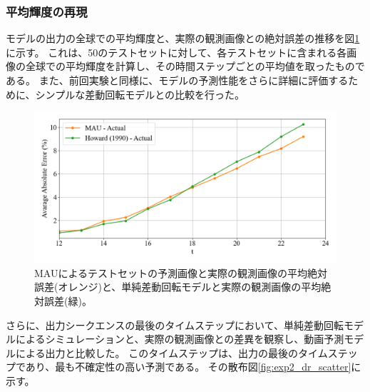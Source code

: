       \subsubsection{平均輝度の再現}
        モデルの出力の全球での平均輝度と、実際の観測画像との絶対誤差の推移を図\ref{fig:exp2_error}に示す。
        これは、50のテストセットに対して、各テストセットに含まれる各画像の全球での平均輝度を計算し、その時間ステップごとの平均値を取ったものである。
        また、前回実験と同様に、モデルの予測性能をさらに詳細に評価するために、シンプルな差動回転モデルとの比較を行った。
        \begin{figure}[htbp]
          \centering
          \includegraphics[width=\textwidth]{figures/exp2/error_dr.png}
          \caption{MAUによるテストセットの予測画像と実際の観測画像の平均絶対誤差(オレンジ)と、単純差動回転モデルと実際の観測画像の平均絶対誤差(緑)。}
          \label{fig:exp2_error}
        \end{figure}
        
        さらに、出力シークエンスの最後のタイムステップにおいて、単純差動回転モデルによるシミュレーションと、実際の観測画像との差異を観察し、動画予測モデルによる出力と比較した。
        このタイムステップは、出力の最後のタイムステップであり、最も不確定性の高い予測である。
        その散布図\ref{fig:exp2_dr_scatter}に示す。

